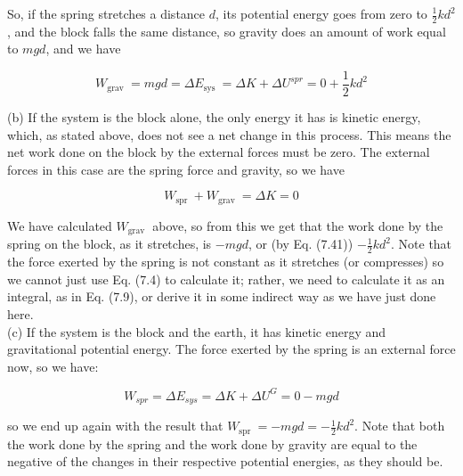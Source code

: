 \documentclass[10pt]{article}
\begin{document}
So, if the spring stretches a distance $d$, its potential energy goes from zero to $\frac{1}{2} k d^{2}$, and the block falls the same distance, so gravity does an amount of work equal to $m g d$, and we have


\begin{equation*}
W_{\text {grav }}=m g d=\Delta E_{\text {sys }}=\Delta K+\Delta U^{s p r}=0+\frac{1}{2} k d^{2} \tag{7.41}
\end{equation*}


(b) If the system is the block alone, the only energy it has is kinetic energy, which, as stated above, does not see a net change in this process. This means the net work done on the block by the external forces must be zero. The external forces in this case are the spring force and gravity, so we have


\begin{equation*}
W_{\text {spr }}+W_{\text {grav }}=\Delta K=0 \tag{7.42}
\end{equation*}


We have calculated $W_{\text {grav }}$ above, so from this we get that the work done by the spring on the block, as it stretches, is $-m g d$, or (by Eq. (7.41)) $-\frac{1}{2} k d^{2}$. Note that the force exerted by the spring is not constant as it stretches (or compresses) so we cannot just use Eq. (7.4) to calculate it; rather, we need to calculate it as an integral, as in Eq. (7.9), or derive it in some indirect way as we have just done here.\\
(c) If the system is the block and the earth, it has kinetic energy and gravitational potential energy. The force exerted by the spring is an external force now, so we have:


\begin{equation*}
W_{s p r}=\Delta E_{s y s}=\Delta K+\Delta U^{G}=0-m g d \tag{7.43}
\end{equation*}


so we end up again with the result that $W_{\text {spr }}=-m g d=-\frac{1}{2} k d^{2}$. Note that both the work done by the spring and the work done by gravity are equal to the negative of the changes in their respective potential energies, as they should be.
\end{document}
